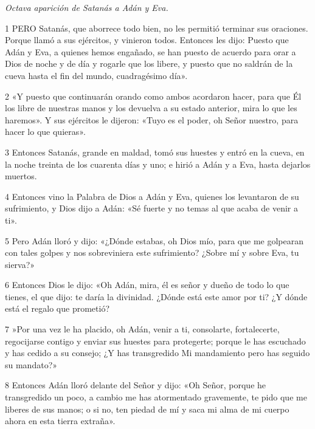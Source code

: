 \par \textit{Octava aparición de Satanás a Adán y Eva.}

\par 1 PERO Satanás, que aborrece todo bien, no les permitió terminar sus oraciones. Porque llamó a sus ejércitos, y vinieron todos. Entonces les dijo: Puesto que Adán y Eva, a quienes hemos engañado, se han puesto de acuerdo para orar a Dios de noche y de día y rogarle que los libere, y puesto que no saldrán de la cueva hasta el fin del mundo, cuadragésimo día».

\par 2 «Y puesto que continuarán orando como ambos acordaron hacer, para que Él los libre de nuestras manos y los devuelva a su estado anterior, mira lo que les haremos». Y sus ejércitos le dijeron: «Tuyo es el poder, oh Señor nuestro, para hacer lo que quieras».

\par 3 Entonces Satanás, grande en maldad, tomó sus huestes y entró en la cueva, en la noche treinta de los cuarenta días y uno; e hirió a Adán y a Eva, hasta dejarlos muertos.

\par 4 Entonces vino la Palabra de Dios a Adán y Eva, quienes los levantaron de su sufrimiento, y Dios dijo a Adán: «Sé fuerte y no temas al que acaba de venir a ti».

\par 5 Pero Adán lloró y dijo: «¿Dónde estabas, oh Dios mío, para que me golpearan con tales golpes y nos sobreviniera este sufrimiento? ¿Sobre mí y sobre Eva, tu sierva?»

\par 6 Entonces Dios le dijo: «Oh Adán, mira, él es señor y dueño de todo lo que tienes, el que dijo: te daría la divinidad. ¿Dónde está este amor por ti? ¿Y dónde está el regalo que prometió?

\par 7 »Por una vez le ha placido, oh Adán, venir a ti, consolarte, fortalecerte, regocijarse contigo y enviar sus huestes para protegerte; porque le has escuchado y has cedido a su consejo; ¿Y has transgredido Mi mandamiento pero has seguido su mandato?»

\par 8 Entonces Adán lloró delante del Señor y dijo: «Oh Señor, porque he transgredido un poco, a cambio me has atormentado gravemente, te pido que me liberes de sus manos; o si no, ten piedad de mí y saca mi alma de mi cuerpo ahora en esta tierra extraña».

